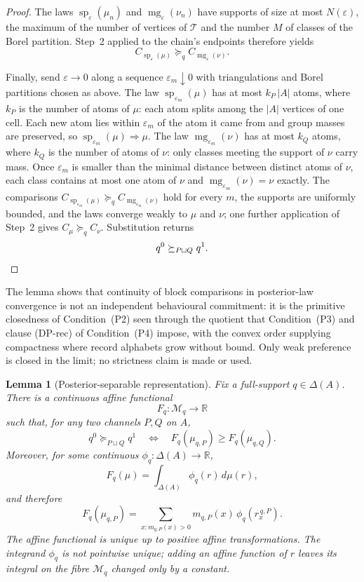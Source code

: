 \documentclass[11pt,a4paper]{article}
\newtheorem{lemma}[theorem]{Lemma}
\theoremstyle{definition}
\newcommand{\R}{\mathbb R}
\newcommand{\1}{\mathbf 1}
\begin{document}
\begin{proof}
The laws $\operatorname{sp}_\varepsilon(\mu_n)$ and $\operatorname{mg}_\varepsilon(\nu_n)$ have supports of size at
most $N(\varepsilon)$, the maximum of the number of vertices of $\mathcal T$ and the number $M$ of classes of the
Borel partition.  Step~2 applied
to the chain's endpoints therefore yields
\[
C_{\operatorname{sp}_\varepsilon(\mu)}
\succeq_q
C_{\operatorname{mg}_\varepsilon(\nu)}.
\]

Finally, send $\varepsilon\to0$ along a sequence $\varepsilon_m\downarrow0$ with triangulations and Borel partitions
chosen as above.  The
law $\operatorname{sp}_{\varepsilon_m}(\mu)$ has at most $k_P\,|A|$ atoms, where $k_P$ is the number of atoms of
$\mu$: each atom splits among the $|A|$ vertices of one cell.  Each new atom lies within $\varepsilon_m$ of the atom
it came from and group masses are preserved, so $\operatorname{sp}_{\varepsilon_m}(\mu)\Rightarrow\mu$.  The law
$\operatorname{mg}_{\varepsilon_m}(\nu)$ has at most $k_Q$ atoms, where $k_Q$ is the number of atoms of $\nu$: only
classes meeting the support of $\nu$ carry mass.  Once $\varepsilon_m$ is smaller than the minimal distance between
distinct atoms of $\nu$, each class contains at most one atom of $\nu$ and
$\operatorname{mg}_{\varepsilon_m}(\nu)=\nu$ exactly.  The comparisons
$C_{\operatorname{sp}_{\varepsilon_m}(\mu)}\succeq_q C_{\operatorname{mg}_{\varepsilon_m}(\nu)}$ hold for every $m$,
the supports are uniformly bounded, and the laws converge weakly to $\mu$ and $\nu$; one further application of
Step~2 gives $C_\mu\succeq_q C_\nu$.  Substitution returns
\[
q^0\succeq_{P\sqcup Q}q^1.
\qedhere
\]
\end{proof}

The lemma shows that continuity of block comparisons in posterior-law convergence is not an independent behavioural
commitment: it is the primitive closedness of Condition~\textup{(P2)} seen through the quotient that
Condition~\textup{(P3)} and clause \textup{(DP-rec)} of Condition~\textup{(P4)} impose, with the convex order supplying compactness where record alphabets
grow without bound.  Only weak preference is closed in the limit; no strictness claim is made or used.

\begin{lemma}[Posterior-separable representation]\label{pt:lem:postsep}
Fix a full-support $q\in\Delta(A)$.  There is a continuous affine functional
\[
F_q:\mathcal M_q\to\R
\]
such that, for any two channels $P,Q$ on $A$,
\[
q^0\succeq_{P\sqcup Q}q^1
\quad\Longleftrightarrow\quad
F_q(\mu_{q,P})\ge F_q(\mu_{q,Q}).
\]
Moreover, for some continuous $\phi_q:\Delta(A)\to\R$,
\[
F_q(\mu)=\int_{\Delta(A)}\phi_q(r)\,d\mu(r),
\]
and therefore
\[
F_q(\mu_{q,P})
=
\sum_{x:m_{q,P}(x)>0}m_{q,P}(x)\,\phi_q(r_x^{\,q,P}).
\]
The affine functional is unique up to positive affine transformations.  The integrand $\phi_q$ is not pointwise unique;
adding an affine function of $r$ leaves its integral on the fibre $\mathcal M_q$ changed only by a constant.
\end{lemma}
\end{document}
